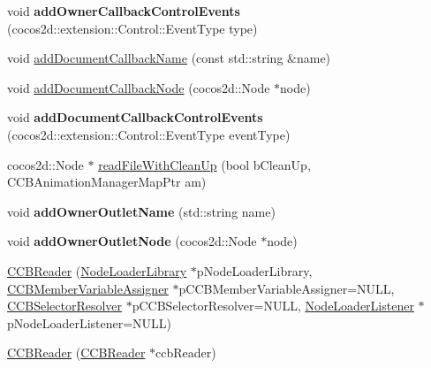 \begin{DoxyCompactItemize}
\mbox{\label{classcocosbuilder_1_1CCBReader_ac0bdd5b2f90f0cd95d82bfc701c84099}} 
void {\bfseries add\+Owner\+Callback\+Control\+Events} (cocos2d\+::extension\+::\+Control\+::\+Event\+Type type)
\item 
void \hyperlink{classcocosbuilder_1_1CCBReader_a30939fd9e92943e77b15d3649ab98e15}{add\+Document\+Callback\+Name} (const std\+::string \&name)
\item 
void \hyperlink{classcocosbuilder_1_1CCBReader_ae7a7339510cc15950f11abdba201b7f9}{add\+Document\+Callback\+Node} (cocos2d\+::\+Node $\ast$node)
\item 
\mbox{\label{classcocosbuilder_1_1CCBReader_a2445f12728e6e7d942a98e4ff4350847}} 
void {\bfseries add\+Document\+Callback\+Control\+Events} (cocos2d\+::extension\+::\+Control\+::\+Event\+Type event\+Type)
\item 
cocos2d\+::\+Node $\ast$ \hyperlink{classcocosbuilder_1_1CCBReader_a8949401039ccc2a96e3484f6c45296f0}{read\+File\+With\+Clean\+Up} (bool b\+Clean\+Up, C\+C\+B\+Animation\+Manager\+Map\+Ptr am)
\item 
\mbox{\label{classcocosbuilder_1_1CCBReader_a0bd3083eb524193f379f2c7ed227e0c7}} 
void {\bfseries add\+Owner\+Outlet\+Name} (std\+::string name)
\item 
\mbox{\label{classcocosbuilder_1_1CCBReader_aa9fa80b734f08fc68c92c8971278fe5c}} 
void {\bfseries add\+Owner\+Outlet\+Node} (cocos2d\+::\+Node $\ast$node)
\item 
\hyperlink{classcocosbuilder_1_1CCBReader_adb695d57810485e6ae5f392f76c6f274}{C\+C\+B\+Reader} (\hyperlink{classcocosbuilder_1_1NodeLoaderLibrary}{Node\+Loader\+Library} $\ast$p\+Node\+Loader\+Library, \hyperlink{classcocosbuilder_1_1CCBMemberVariableAssigner}{C\+C\+B\+Member\+Variable\+Assigner} $\ast$p\+C\+C\+B\+Member\+Variable\+Assigner=N\+U\+LL, \hyperlink{classcocosbuilder_1_1CCBSelectorResolver}{C\+C\+B\+Selector\+Resolver} $\ast$p\+C\+C\+B\+Selector\+Resolver=N\+U\+LL, \hyperlink{classcocosbuilder_1_1NodeLoaderListener}{Node\+Loader\+Listener} $\ast$p\+Node\+Loader\+Listener=N\+U\+LL)
\item 
\hyperlink{classcocosbuilder_1_1CCBReader_af51acafdd83099e8e66fd8793036200d}{C\+C\+B\+Reader} (\hyperlink{classcocosbuilder_1_1CCBReader}{C\+C\+B\+Reader} $\ast$ccb\+Reader)

\end{DoxyCompactItemize}
